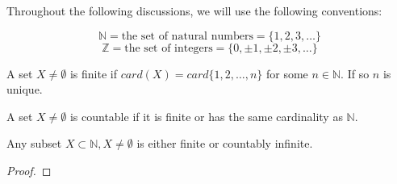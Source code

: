 

Throughout the following discussions, we will use the following conventions:

\[ \mathbb{N} = \text{the set of natural numbers} = \{1,2,3,\ldots\} \]
\[ \mathbb{Z} = \text{the set of integers} = \{0,\pm 1, \pm 2, \pm 3, \ldots\} \]

\begin{mydef}
A set $X\neq \emptyset$ is finite if $card(X)=card\{1,2,\ldots,n\}$ for some $n \in \mathbb{N}$. If so $n$ is unique.
\end{mydef}

\begin{mydef}
A set $X\neq \emptyset$ is countable if it is finite or has the same cardinality as $\mathbb{N}$.
\end{mydef}

\begin{lemma}
Any subset $X\subset \mathbb{N}, X\neq \emptyset$ is either finite or countably infinite.
\end{lemma}
\begin{proof}
\homework
\end{proof}

